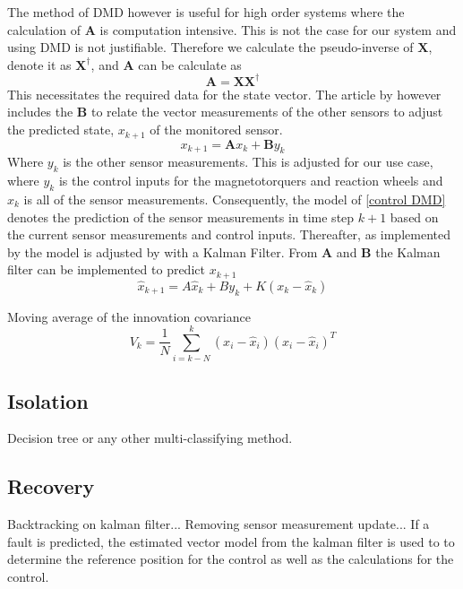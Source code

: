 \documentclass[letterpaper, 10 pt, conference]{ieeeconf}  %
\begin{document}
The method of DMD however is useful for high order systems where the calculation of $\mathbf{A}$ is computation intensive. This is not the case for our system and using DMD is not justifiable. Therefore we calculate the pseudo-inverse of $\mathbf{X}$, denote it as $\mathbf{X^{\dagger}}$, and $\mathbf{A}$ can be calculate as
\begin{equation}
	\mathbf{A} = \mathbf{X}\mathbf{X^{\dagger}}
\end{equation}
This necessitates the required data for the state vector. The article by \textcite{DeSilva2020} however includes the $\mathbf{B}$ to relate the vector measurements of the other sensors to adjust the predicted state, $x_{k+1}$ of the monitored sensor. 
\begin{equation}
	x_{k+1} = \boldsymbol{A}x_k + \boldsymbol{B}y_k
	\label{control DMD}
\end{equation}
Where $y_k$ is the other sensor measurements. This is adjusted for our use case, where $y_k$ is the control inputs for the magnetotorquers and reaction wheels and $x_k$ is all of the sensor measurements. Consequently, the model of \ref{control DMD} denotes the prediction of the sensor measurements in time step $k+1$ based on the current sensor measurements and control inputs.
Thereafter, as implemented by \textcite{DeSilva2020} the model is adjusted by with a Kalman Filter. From $\boldsymbol{A}$ and $\boldsymbol{B}$ the Kalman filter can be implemented to predict $x_{k+1}$
\begin{equation}
	\hat{x}_{k+1} = A\hat{x}_k + By_k + K(x_k - \hat{x}_k)
\end{equation}

Moving average of the innovation covariance
\begin{equation}
	V_k = \frac{1}{N} \sum_{i=k-N}^k (x_i - \hat{x}_i)(x_i - \hat{x}_i)^T
\end{equation}


\subsection{Isolation}
Decision tree or any other multi-classifying method.

\subsection{Recovery}
Backtracking on kalman filter... Removing sensor measurement update... If a fault is predicted, the estimated vector model from the kalman filter is used to to determine the reference position for the control as well as the calculations for the control.
\end{document}
